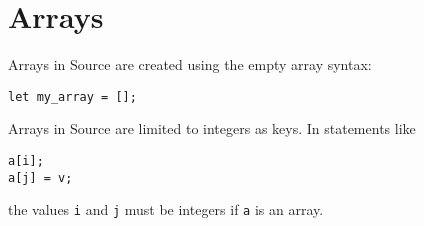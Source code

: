 \section*{Arrays}

Arrays in Source are created using the empty array syntax:
\begin{lstlisting}
let my_array = [];
\end{lstlisting}
Arrays in Source are limited to integers as keys.
In statements like
\begin{lstlisting}
a[i];
a[j] = v;
\end{lstlisting}
the values \lstinline{i} and \lstinline{j} must be integers if \lstinline{a} is an array.


